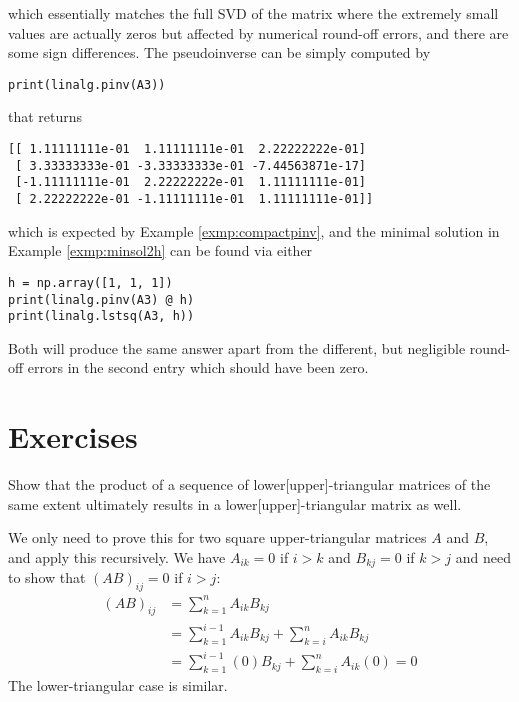 which essentially matches the full SVD of the matrix where the extremely small values are actually zeros but affected by numerical round-off errors, and there are some sign differences. The pseudoinverse can be simply computed by
\begin{lstlisting}
print(linalg.pinv(A3))
\end{lstlisting}
that returns
\begin{lstlisting}
[[ 1.11111111e-01  1.11111111e-01  2.22222222e-01]
 [ 3.33333333e-01 -3.33333333e-01 -7.44563871e-17]
 [-1.11111111e-01  2.22222222e-01  1.11111111e-01]
 [ 2.22222222e-01 -1.11111111e-01  1.11111111e-01]]    
\end{lstlisting}
which is expected by Example \ref{exmp:compactpinv}, and the minimal solution in Example \ref{exmp:minsol2h} can be found via either
\begin{lstlisting}
h = np.array([1, 1, 1])
print(linalg.pinv(A3) @ h)
print(linalg.lstsq(A3, h))    
\end{lstlisting}
Both will produce the same answer apart from the different, but negligible round-off errors in the second entry which should have been zero.

\section{Exercises}

\begin{Exercise}
\label{ex:triangularprod}
Show that the product of a sequence of lower[upper]-triangular matrices of the same extent ultimately results in a lower[upper]-triangular matrix as well.
\end{Exercise}
\begin{Answer}
We only need to prove this for two square upper-triangular matrices $A$ and $B$, and apply this recursively. We have $A_{ik} = 0$ if $i > k$ and $B_{kj} = 0$ if $k > j$ and need to show that $(AB)_{ij} = 0$ if $i > j$:
\begin{align*}
(AB)_{ij} &= \sum_{k=1}^n A_{ik}B_{kj} \\
&= \sum_{k=1}^{i-1} A_{ik}B_{kj} + \sum_{k=i}^n A_{ik}B_{kj} \\
&= \sum_{k=1}^{i-1} (0)B_{kj} + \sum_{k=i}^n A_{ik}(0) = 0
\end{align*}
The lower-triangular case is similar.
\end{Answer}

